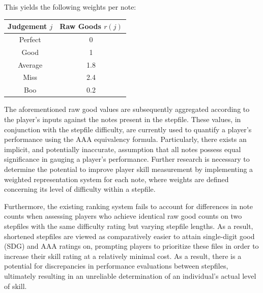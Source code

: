 This yields the following weights per note:

\begin{center}
	\begin{tabular}{c@{\hskip 5mm}c}
		\hspace{5mm} \textbf{Judgement} $j$ \hspace{5mm} & \textbf{Raw Goods} $r(j)$ \\
            \hline
		Perfect                               & 0                         \\
		Good                                  & 1                         \\
		Average                               & 1.8                       \\
		Miss                                  & 2.4                       \\
		Boo                                   & 0.2                       \\
	\end{tabular}
\end{center}

The aforementioned raw good values are subsequently aggregated according to the player's inputs against the notes present in the stepfile. These values, in conjunction with the stepfile difficulty, are currently used to quantify a player's performance using the AAA equivalency formula. Particularly, there exists an implicit, and potentially inaccurate, assumption that all notes possess equal significance in gauging a player's performance. Further research is necessary to determine the potential to improve player skill measurement by implementing a weighted representation system for each note, where weights are defined concerning its level of difficulty within a stepfile. 

\vspace{2mm}

Furthermore, the existing ranking system fails to account for differences in note counts when assessing players who achieve identical raw good counts on two stepfiles with the same difficulty rating but varying stepfile lengths. As a result, shortened stepfiles are viewed as comparatively easier to attain single-digit good (SDG) and AAA ratings on, prompting players to prioritize these files in order to increase their skill rating at a relatively minimal cost. As a result, there is a potential for discrepancies in performance evaluations between stepfiles, ultimately resulting in an unreliable determination of an individual's actual level of skill.

